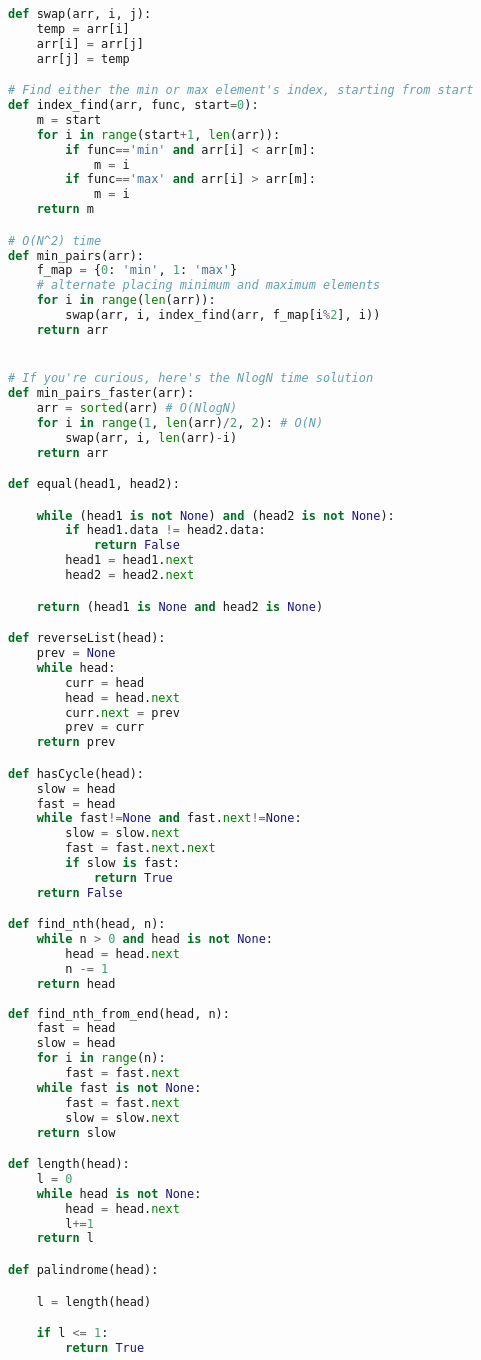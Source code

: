 \documentclass{article}
\begin{document}
\clearpage

\begin{lstlisting}[language=Python]
def swap(arr, i, j):
    temp = arr[i]
    arr[i] = arr[j]
    arr[j] = temp

# Find either the min or max element's index, starting from start
def index_find(arr, func, start=0):
    m = start
    for i in range(start+1, len(arr)):
        if func=='min' and arr[i] < arr[m]:
            m = i
        if func=='max' and arr[i] > arr[m]:
            m = i
    return m

# O(N^2) time
def min_pairs(arr):
    f_map = {0: 'min', 1: 'max'}
    # alternate placing minimum and maximum elements
    for i in range(len(arr)):
        swap(arr, i, index_find(arr, f_map[i%2], i))
    return arr


# If you're curious, here's the NlogN time solution
def min_pairs_faster(arr):
    arr = sorted(arr) # O(NlogN)
    for i in range(1, len(arr)/2, 2): # O(N)
        swap(arr, i, len(arr)-i)
    return arr

def equal(head1, head2):

    while (head1 is not None) and (head2 is not None):
        if head1.data != head2.data:
            return False
        head1 = head1.next
        head2 = head2.next

    return (head1 is None and head2 is None)

def reverseList(head):
    prev = None
    while head:
        curr = head
        head = head.next
        curr.next = prev
        prev = curr
    return prev

def hasCycle(head):
    slow = head
    fast = head
    while fast!=None and fast.next!=None:
        slow = slow.next
        fast = fast.next.next
        if slow is fast:
            return True
    return False

def find_nth(head, n):
    while n > 0 and head is not None:
        head = head.next
        n -= 1
    return head
    
def find_nth_from_end(head, n):
    fast = head
    slow = head
    for i in range(n):
        fast = fast.next
    while fast is not None:
        fast = fast.next
        slow = slow.next
    return slow

def length(head):
    l = 0
    while head is not None:
        head = head.next
        l+=1
    return l

def palindrome(head):

    l = length(head)

    if l <= 1:
        return True


\end{lstlisting}
\end{document}
